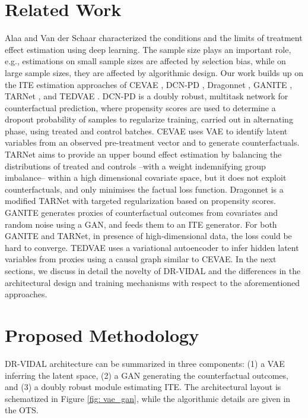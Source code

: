 \documentclass{amia}
\begin{document}
\section*{Related Work}
Alaa and Van der Schaar \cite{pmlr-v80-alaa18a} characterized the conditions and the limits of treatment effect estimation using deep learning. The sample size plays an important role, e.g., estimations on small sample sizes are affected by selection bias, while on large sample sizes, they are affected by algorithmic design. Our work builds up on the ITE estimation approaches of CEVAE \cite{louizos2017causal}, DCN-PD \cite{alaa2017deep}, Dragonnet \cite{shi2019adapting}, GANITE \cite{Yoon2018}, TARNet \cite{pmlr-v70-shalit17a}, and TEDVAE \cite{zhang2020treatment}. DCN-PD is a doubly robust, multitask network for counterfactual prediction, where propensity scores are used to determine a dropout probability of samples to regularize training, carried out in alternating phase, using treated and control batches. CEVAE uses VAE to identify latent variables from an observed pre-treatment vector and to generate counterfactuals. TARNet aims to provide an upper bound effect estimation by balancing the distributions of treated and controls --with a weight indemnifying group imbalance-- within a high dimensional covariate space, but it does not exploit counterfactuals, and only minimises the factual loss function. Dragonnet is a modified TARNet with targeted regularization based on propensity scores. GANITE generates proxies of counterfactual outcomes from covariates and random noise using a GAN, and feeds them to an ITE generator. For both GANITE and TARNet, in presence of high-dimensional data, the loss could be hard to converge. TEDVAE \cite{zhang2020treatment} uses a variational autoencoder to infer hidden latent variables from proxies using a causal graph similar to CEVAE. In the next sections, we discuss in detail the novelty of DR-VIDAL and the differences in the architectural design and training mechanisms with respect to the aforementioned approaches. 


\section*{Proposed Methodology}
DR-VIDAL architecture can be summarized in three components: (1) a VAE inferring the latent space, (2) a GAN generating the counterfactual outcomes, and (3) a doubly robust module estimating ITE. The architectural layout is schematized in Figure \ref{fig: vae_gan}, while the algorithmic details are given in the OTS.
\end{document}
